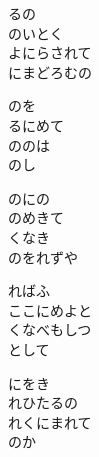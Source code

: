 \documentclass[10pt,b5j]{tarticle} %
\begin{document}
\vspace{1.5em} %
\newcommand{\linespace}{0.5em} %
\newcommand{\blocksize}{0.5\hsize} %
\begin{enumerate} %
    \begin{minipage}[c]{\blocksize}
    
        \vspace{\linespace}
        \item
        るの\\
        のいとく\\
        よにらされて\\
        にまどろむの
        
        \vspace{\linespace}
        \item
        のを\\
        るにめて\\
        ののは\\
        のし
        
        \vspace{\linespace}
        \item
        のにの\\
        のめきて\\
        くなき\\
        のをれずや
        
        \vspace{\linespace}
        \item
        ればふ\\
        ここにめよと\\
        くなべもしつ\\
        として
        
        \vspace{\linespace}
        \item
        にをき\\
        れひたるの\\
        れくにまれて\\
        のか
        

\end{minipage}
\end{enumerate}
\end{document}
